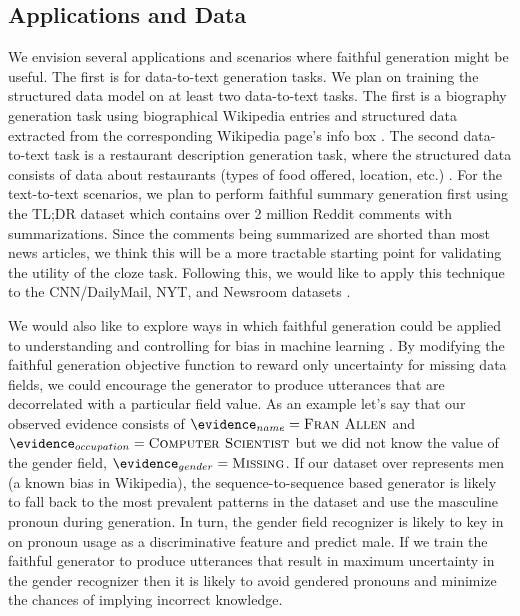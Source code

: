 
 \subsection{Applications and Data}
We envision several applications and scenarios where faithful generation might
be useful. The first is for data-to-text generation tasks. We plan on 
training the structured data model on at least two data-to-text tasks. 
The first is a biography generation task using biographical Wikipedia
entries and structured data extracted from the corresponding Wikipedia page's
info box \citep{lebret2016neural}. The second data-to-text task is a 
restaurant description generation task, where the structured data consists
of data about restaurants (types of food offered, location, etc.) 
\citep{novikova2017e2e}.
For the text-to-text scenarios, we plan to perform faithful summary generation
first using the TL;DR dataset \citep{volske2017tl} which contains over 2 
million
Reddit comments with summarizations. Since the comments being summarized
are shorted than most news articles, we think this will be a more tractable
starting point for validating the utility of the cloze task.
Following this, we would like to apply this technique to
the CNN/DailyMail, NYT, and Newsroom datasets 
\citep{hermann2015teaching,sandhaus2008new,grusky2018newsroom}.


We would also like to explore ways in which faithful generation could 
be applied to understanding and controlling for bias in machine learning
\citep{bolukbasi2016man}. By modifying the faithful generation objective
function to reward only uncertainty for missing data fields, we could 
encourage the generator to produce utterances that are decorrelated with 
a particular field value. 
As an example let's say that our observed evidence consists
of $\evidence_{name} = \textsc{Fran Allen}$ and  
$\evidence_{occupation} = \textsc{Computer Scientist}$
but we did not know the value of the gender field, 
$\evidence_{gender} = \textsc{Missing} $. If our dataset over 
represents men (a known bias in Wikipedia), 
the sequence-to-sequence based generator is 
likely to fall back to the most prevalent patterns in the dataset and use
the masculine pronoun during generation. In turn, 
the gender field recognizer is likely
to key in on pronoun usage as a discriminative feature and predict male.
If we train the faithful generator to produce utterances that result in
maximum uncertainty in the gender 
recognizer then it is likely to avoid gendered pronouns and minimize
the chances of implying incorrect knowledge.
